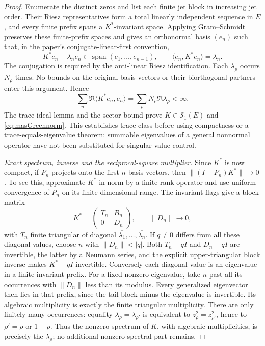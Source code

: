 \documentclass[11pt,a4paper]{article}
\newcommand{\Sone}{\mathcal S_1}
\begin{document}
\begin{proof}
Enumerate the distinct zeros and list each finite jet block in increasing jet order. Their Riesz representatives form a total linearly independent sequence in $E$, and every finite prefix spans a $K^*$-invariant space. Applying Gram--Schmidt preserves these finite-prefix spaces and gives an orthonormal basis $(e_n)$ such that, in the paper's conjugate-linear-first convention,
\[
 K^*e_n-\overline{\lambda_n}e_n\in\operatorname{span}(e_1,\ldots,e_{n-1}),
 \qquad \langle e_n,K^*e_n\rangle=\overline{\lambda_n}.
\]
The conjugation is required by the anti-linear Riesz identification. Each $\lambda_\rho$ occurs $N_\rho$ times. No bounds on the original basis vectors or their biorthogonal partners enter this argument. Hence
\[
 \sum_n\Re\langle K^*e_n,e_n\rangle
 =\sum_\rho N_\rho\Re\lambda_\rho<\infty.
\]
The trace-ideal lemma and the sector bound prove $K\in\Sone(E)$ and
\eqref{eq:masGreennorm}. This establishes trace class before using compactness or a trace-equals-eigenvalue theorem; summable eigenvalues of a general nonnormal operator have not been substituted for singular-value control.

\emph{Exact spectrum, inverse and the reciprocal-square multiplier.}
Since $K^*$ is now compact, if $P_n$ projects onto the first $n$ basis vectors, then
$\|(I-P_n)K^*\|\to0$. To see this, approximate $K^*$ in norm by a finite-rank operator and use uniform convergence of $P_n$ on its finite-dimensional range. The invariant flags give a block matrix
\[
 K^*=\begin{pmatrix}T_n&B_n\\0&D_n\end{pmatrix},
 \qquad \|D_n\|\longrightarrow0,
\]
with $T_n$ finite triangular of diagonal $\overline{\lambda_1},\ldots,\overline{\lambda_n}$.
If $q\ne0$ differs from all these diagonal values, choose $n$ with $\|D_n\|<|q|$. Both $T_n-qI$ and $D_n-qI$ are invertible, the latter by a Neumann series, and the explicit upper-triangular block inverse makes $K^*-qI$ invertible. Conversely each diagonal value is an eigenvalue in a finite invariant prefix. For a fixed nonzero eigenvalue, take $n$ past all its occurrences with $\|D_n\|$ less than its modulus. Every generalized eigenvector then lies in that prefix, since the tail block minus the eigenvalue is invertible. Its algebraic multiplicity is exactly the finite triangular multiplicity. There are only finitely many occurrences: equality $\lambda_\rho=\lambda_{\rho'}$ is equivalent to $z_\rho^2=z_{\rho'}^2$, hence to $\rho'=\rho$ or $1-\rho$. Thus the nonzero spectrum of $K$, with algebraic multiplicities, is precisely the $\lambda_\rho$; no additional nonzero spectral part remains.


\end{proof}
\end{document}
